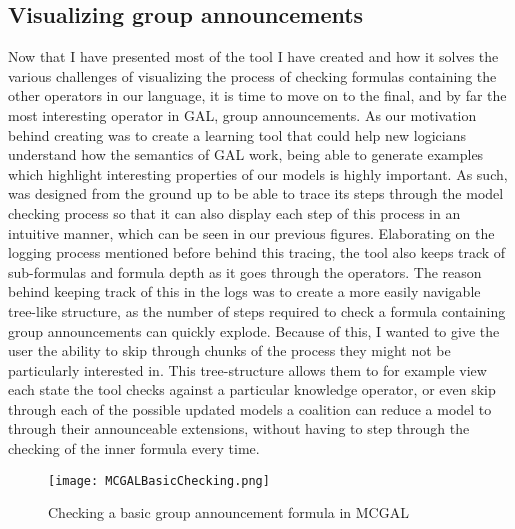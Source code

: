 \subsection{Visualizing group announcements}

Now that I have presented most of the tool I have created and how it solves the various challenges of visualizing the process of checking formulas containing the other operators in our language, it is time to move on to the final, and by far the most interesting operator in GAL, group announcements. As our motivation behind creating \cname{} was to create a learning tool that could help new logicians understand how the semantics of GAL work, being able to generate examples which highlight interesting properties of our models is highly important. As such, \cname{} was designed from the ground up to be able to trace its steps through the model checking process so that it can also display each step of this process in an intuitive manner, which can be seen in our previous figures. Elaborating on the logging process mentioned before behind this tracing, the tool also keeps track of sub-formulas and formula depth as it goes through the operators. The reason behind keeping track of this in the logs was to create a more easily navigable tree-like structure, as the number of steps required to check a formula containing group announcements can quickly explode. Because of this, I wanted to give the user the ability to skip through chunks of the process they might not be particularly interested in. This tree-structure allows them to for example view each state the tool checks against a particular knowledge operator, or even skip through each of the possible updated models a coalition can reduce a model to through their announceable extensions, without having to step through the checking of the inner formula every time. 
 
\begin{figure}[]
	\label{fig:basicGalChecking}
	\caption{Checking a basic group announcement formula in MCGAL}
	\texttt{[image: MCGALBasicChecking.png]}
\end{figure}

